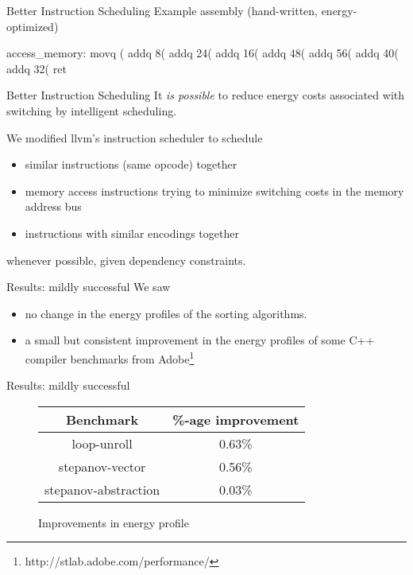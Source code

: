 \documentclass[xcolor=dvipsnames]{beamer}
\begin{document}
\begin{frame}[fragile]{Better Instruction Scheduling}
  Example assembly (hand-written, energy-optimized)

  \begin{gascode}
    access_memory:
      movq    (%
      addq    8(%
      addq    24(%
      addq    16(%
      addq    48(%
      addq    56(%
      addq    40(%
      addq    32(%
      ret
  \end{gascode}
\end{frame}

\begin{frame}{Better Instruction Scheduling}
  It \textit{is possible} to reduce energy costs associated with
  switching by intelligent scheduling.

  \smallskip

  We modified llvm's instruction scheduler to schedule

  \begin{itemize}
    \item similar instructions (same opcode) together
    \item memory access instructions trying to minimize switching
      costs in the memory address bus
    \item instructions with similar encodings together
  \end{itemize}

  whenever possible, given dependency constraints.
\end{frame}

\begin{frame}{Results: mildly successful}
  We saw

  \begin{itemize}
    \item no change in the energy profiles of the sorting algorithms.
    \item a small but consistent improvement in the energy profiles of
      some C++ compiler benchmarks from
      Adobe\footnote{http://stlab.adobe.com/performance/}
  \end{itemize}

\end{frame}

\begin{frame}{Results: mildly successful}
  \begin{figure}
    \centering
    \renewcommand{\arraystretch}{1.5}
    \begin{tabular}{| c | c | }
      \hline
      \textbf{Benchmark} & \textbf{\%-age improvement} \\
      \hline

      loop-unroll & 0.63\% \\
      stepanov-vector & 0.56\% \\
      stepanov-abstraction & 0.03\% \\
      \hline
    \end{tabular}
    \caption{Improvements in energy profile}
    \label{fig:improvements}
  \end{figure}
\end{frame}
\end{document}
